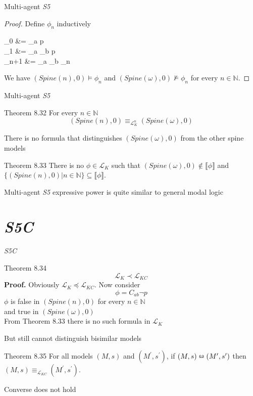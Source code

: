 \documentclass{beamer}
\newcommand{\lang}{\mathcal{L}}
\newcommand{\Mpr}{M^\prime}
\newcommand{\spr}{s^\prime}
\begin{document}
\begin{frame}{Multi-agent \textit{S5}}
	\begin{proof}
		Define $\phi_n$ inductively
		\begin{flalign*}
			\phi_0 &= _a p\\
			\phi_1 &= \hat{K}_a _b p\\
			\phi_{n+1} &= _a _b \phi_n
		\end{flalign*}
		We have $(Spine(n),0) \models \phi_n$ and $(Spine(\omega),0) \not\models \phi_n$ for every $n \in \mathbb{N}$.
	\end{proof}
\end{frame}

\begin{frame}{Multi-agent \textit{S5}}
	\begin{block}{Theorem 8.32}
		For every $n \in \mathbb{N}$
		\[(Spine(n),0) \equiv_{\lang_K^n} (Spine(\omega),0)\]
	\end{block} \pause
	There is no formula that distinguishes $(Spine(\omega),0)$ from the other spine models \pause
	\begin{block}{Theorem 8.33}
		There is no $\phi \in \lang_K$ such that $(Spine(\omega),0) \notin \llbracket \phi \rrbracket$ and $\{(Spine(n),0) | n \in \mathbb{N}\} \subseteq \llbracket \phi \rrbracket$.
	\end{block} \pause
	Multi-agent \textit{S5} expressive power is quite similar to general modal logic
\end{frame}


\section*{\textit{S5C}}

\begin{frame}{\textit{S5C}}
	\begin{block}{Theorem 8.34}
		\[\lang_K \prec \lang_{KC}\] \pause
		\textbf{Proof.} Obviously $\lang_K \preceq \lang_{KC}$.
		Now consider
		\[\phi = C_{ab} \neg p\]
		$\phi$ is false in $(Spine(n),0)$ for every $n \in \mathbb{N}$\\
		and true in $(Spine(\omega),0)$
		\\[4pt]
		From Theorem 8.33 there is no such formula in $\lang_K$
	\end{block} \pause
	But still cannot distinguish bisimilar models
	\begin{block}{Theorem 8.35}
		For all models $(M,s)$ and $(\Mpr,\spr)$, if $(M,s) \leftrightarroweq (\Mpr,\spr)$ then $(M,s) \equiv_{\lang_{KC}} (\Mpr,\spr)$.
	\end{block}
	Converse does not hold
\end{frame}
\end{document}

